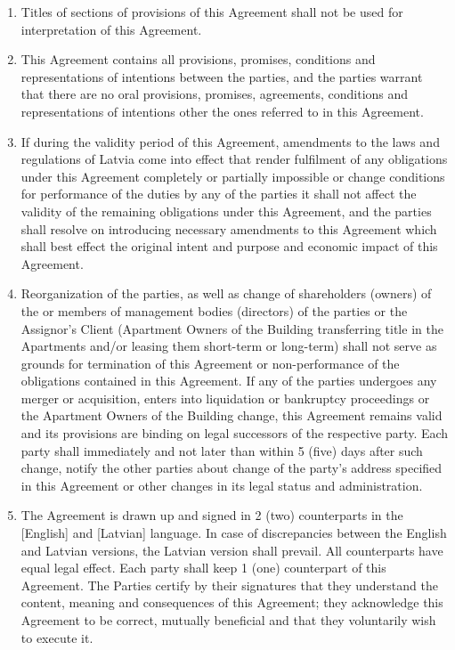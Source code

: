 \documentclass[a4paper]{article}
\begin{document}
\begin{multicols}{2}
\begin{enumerate}
  \item{Titles of sections of provisions of this Agreement shall not
      be used for interpretation of this Agreement.}

  \item{This Agreement contains all provisions, promises, conditions
      and representations of intentions between the parties, and the
      parties warrant that there are no oral provisions, promises,
      agreements, conditions and representations of intentions other
      the ones referred to in this Agreement.}

  \item{If during the validity period of this Agreement, amendments to
      the laws and regulations of Latvia come into effect that render
      fulfilment of any obligations under this Agreement completely or
      partially impossible or change conditions for performance of the
      duties by any of the parties it shall not affect the validity of
      the remaining obligations under this Agreement, and the parties
      shall resolve on introducing necessary amendments to this
      Agreement which shall best effect the original intent and
      purpose and economic impact of this Agreement. }

  \item{Reorganization of the parties, as well as change of
      shareholders (owners) of the or members of management bodies
      (directors) of the parties or the Assignor's Client (Apartment
      Owners of the Building transferring title in the Apartments
      and/or leasing them short{-}term or long{-}term) shall not serve
      as grounds for termination of this Agreement or
      non{-}performance of the obligations contained in this
      Agreement. If any of the parties undergoes any merger or
      acquisition, enters into liquidation or bankruptcy proceedings
      or the Apartment Owners of the Building change, this Agreement
      remains valid and its provisions are binding on legal successors
      of the respective party. Each party shall immediately and not
      later than within 5 (five) days after such change, notify the
      other parties about change of the party’s address specified in
      this Agreement or other changes in its legal status and
      administration.}

  \item{The Agreement is drawn up and signed in 2 (two) counterparts
      in the {[}English{]} and {[}Latvian{]} language. In case of
      discrepancies between the English and Latvian versions, the
      Latvian version shall prevail. All counterparts have equal legal
      effect. Each party shall keep 1 (one) counterpart of this
      Agreement. The Parties certify by their signatures that they
      understand the content, meaning and consequences of this
      Agreement; they acknowledge this Agreement to be correct,
      mutually beneficial and that they voluntarily wish to execute
      it. }
  \end{enumerate}


\end{multicols}
\end{document}
